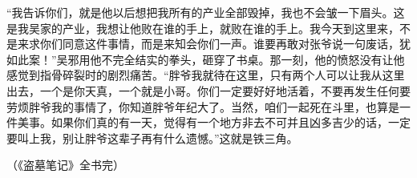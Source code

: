 “我告诉你们，就是他以后想把我所有的产业全部毁掉，我也不会皱一下眉头。这是我吴家的产业，我想让他败在谁的手上，就败在谁的手上。我今天到这里来，不是来求你们同意这件事情，而是来知会你们一声。谁要再敢对张爷说一句废话，犹如此案！”吴邪用他不完全结实的拳头，砸穿了书桌。那一刻，他的愤怒没有让他感觉到指骨碎裂时的剧烈痛苦。“胖爷我就待在这里，只有两个人可以让我从这里出去，一个是你天真，一个就是小哥。你们一定要好好地活着，不要再发生任何要劳烦胖爷我的事情了，你知道胖爷年纪大了。当然，咱们一起死在斗里，也算是一件美事。如果你们真的有一天，觉得有一个地方非去不可并且凶多吉少的话，一定要叫上我，别让胖爷这辈子再有什么遗憾。”这就是铁三角。

{\fzqiti\hfill （《盗墓笔记》全书完）}
